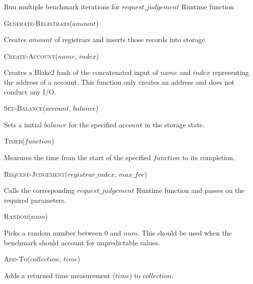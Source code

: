 \documentclass[11pt,a4paper]{article}
\newcommand{\SubItem}[1]{
    {\setlength\itemindent{15pt} \item[-] #1}
}
\begin{document}
\begin{algorithm}[H]
  \caption{Run multiple benchmark iterations for $request\_judgement$ Runtime function}
  \SetAlgoLined
  \BlankLine
\end{algorithm}

\begin{itemize}
  \item \textsc{Generate-Registrars($amount$)}
  \SubItem{Creates $amount$ of registrars and inserts those records into storage.}
  \item \textsc{Create-Account($name$, $index$)} \SubItem{Creates a Blake2 hash
      of the concatenated input of $name$ and $index$ representing the address
      of a account. This function only creates an address and does not conduct
      any I/O.}
  \item \textsc{Set-Balance($account$, $balance$)}
  \SubItem{Sets a initial $balance$ for the specified $account$ in the storage state.}
  \item \textsc{Timer($function$)}
  \SubItem{Measures the time from the start of the specified $function$ to its completion.}
  \item \textsc{Request-Judgement($registrar\_index$, $max\_fee$)}
  \SubItem{Calls the corresponding $request\_judgement$ Runtime function and passes on
  the required parameters.}
  \item \textsc{Random($num$)}
  \SubItem{Picks a random number between 0 and $num$. This should be used when the benchmark
  should account for unpredictable values.}
  \item \textsc{Add-To($collection$, $time$)}
  \SubItem{Adds a returned time measurement ($time$) to $collection$.}
\end{itemize}
\end{document}
